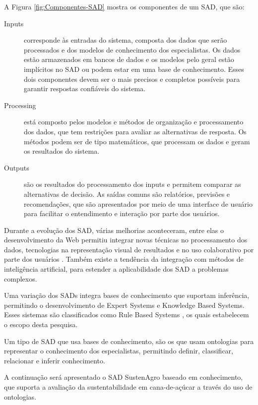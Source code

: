 A Figura \ref{fig:Componentes-SAD} mostra os componentes de um SAD,
que são: 
\begin{description}
\item [{I\foreignlanguage{english}{nputs}}] corresponde às entradas do
sistema, composta dos dados que serão processados e dos modelos de
conhecimento dos especialistas. Os dados estão armazenados em bancos
de dados e os modelos pelo geral estão implícitos no SAD ou podem
estar em uma base de conhecimento. Esses dois componentes devem ser
o mais precisos e completos possíveis para garantir respostas confiáveis
do sistema.
%
\item [{Processing}] \foreignlanguage{brazil}{está composto pelos modelos
e métodos de organização e processamento dos dados, que tem restrições
para avaliar as alternativas de resposta. Os métodos podem ser de
tipo matemáticos, que processam os dados e geram os resultados do
sistema.}
\item [{Outputs}] \foreignlanguage{brazil}{são os resultados do processamento
dos inputs e permitem comparar as alternativas de decisão. As saídas
comuns são relatórios, previsões e recomendações, que são apresentados
por meio de uma interface de usuário para facilitar o entendimento
e interação por parte dos usuários.}
\end{description}
Durante a evolução dos SAD, várias melhorias aconteceram, entre elas
o desenvolvimento da Web permitiu integrar novas técnicas no processamento
dos dados, tecnologias na representação visual de resultados e no
uso colaborativo por parte dos usuários \citep{Shim2002}. Também
existe a tendência da integração com métodos de inteligência artificial,
para estender a aplicabilidade dos SAD a problemas complexos. 

Uma variação dos SADs integra bases de conhecimento que suportam inferência,
permitindo o desenvolvimento de \foreignlanguage{english}{Expert Systems}
e \foreignlanguage{english}{Knowledge Based Systems.} Esses sistemas
são classificados como \foreignlanguage{english}{Rule Based Systems}
\citep{Tweedale2016}, os quais estabelecem o escopo desta pesquisa. 

Um tipo de SAD que usa bases de conhecimento, são os que usam ontologias
para representar o conhecimento dos especialistas, permitindo definir,
classificar, relacionar e inferir conhecimento. 

A continuação será apresentado o SAD SustenAgro baseado em conhecimento,
que suporta a avaliação da sustentabilidade em cana-de-açúcar a través
do uso de ontologias.

